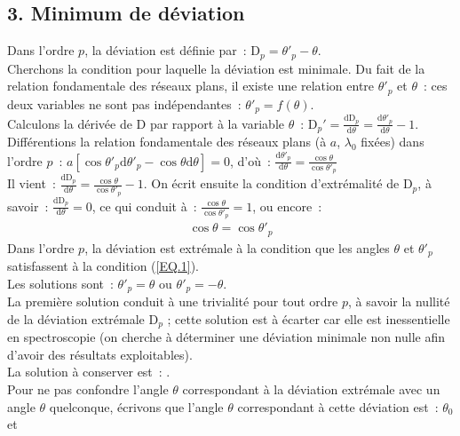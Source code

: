 \documentclass{article}
\newcommand{\mathcolorbox}[2]{\fcolorbox{black}{#1}{$#2$}}
\begin{document}
\subsection*{3.  Minimum de déviation}
Dans l'ordre $p$, la déviation est définie par : $\mathrm{D}_{p} =
\theta'_{p}-\theta$. \\
Cherchons la condition pour laquelle la déviation est minimale. Du
fait de la relation fondamentale des réseaux plans, il existe une
relation entre $\theta'_{p}$ et $\theta$ : ces deux variables ne
sont pas indépendantes : $\theta'_{p} = f\left(\theta\right)$. \\
Calculons la dérivée de $\mathrm{D}$ par rapport à la variable $\theta$ :
$\mathrm{D}_{p}'
= \frac{\mathrm{d}\mathrm{D}_{p}}{\mathrm{d}\theta} = \frac{\mathrm{d}\theta'_{p}}{\mathrm{d}\theta} - 1$. \\
Différentions la relation fondamentale des réseaux plans (à $a$,
$\lambda_{0}$ fixées) dans l'ordre $p$ :
$a\left[\cos\theta'_{p}\mathrm{d}\theta'_{p} - \cos\theta \mathrm{d}\theta\right] = 0$, d'où :
$\frac{\mathrm{d}\theta'_{p}}{\mathrm{d}\theta} = \frac{\cos\theta}{\cos\theta'_{p}}$
\\
Il vient : $\frac{\mathrm{d}\mathrm{D}_{p}}{\mathrm{d}\theta} =
\frac{\cos\theta}{\cos\theta'_{p}} - 1$. On écrit ensuite la
condition d'extrémalité de $\mathrm{D}_{p}$, à savoir :
$\frac{\mathrm{d}\mathrm{D}_{p}}{\mathrm{d}\theta} = 0$, ce qui conduit à :
$\frac{\cos\theta}{\cos\theta'_{p}} = 1$, ou encore :
\begin{eqnarray}\label{EQ.1}
\cos\theta = \cos \theta'_{p}
\end{eqnarray}
Dans l'ordre $p$, la déviation est extrémale à la condition que les
angles $\theta$ et $\theta'_{p}$ satisfassent à la condition
(\ref{EQ.1}). \\
Les solutions sont : $\theta'_{p} = \theta$ ou $\theta'_{p} =
-\theta$. \\
La première solution conduit à une trivialité pour tout ordre $p$, à
savoir la nullité de la déviation extrémale $\mathrm{D}_{p}$ ; cette solution
est à écarter car elle est inessentielle en spectroscopie (on
cherche à déterminer une déviation minimale non nulle afin d'avoir
des résultats exploitables). \\
La solution à conserver est : \mathcolorbox{gray!20}{\theta'_{p} = -\theta}. \\
Pour ne pas confondre l'angle $\theta$ correspondant à la déviation
extrémale avec un angle $\theta$ quelconque, écrivons que l'angle
$\theta$ correspondant à cette déviation est : $\theta_{0}$ et
\end{document}
